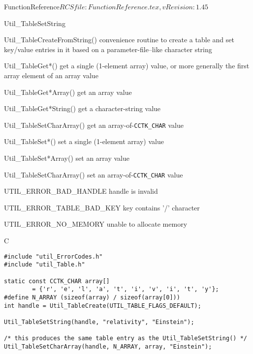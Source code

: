 \begin{cactuspart}{5}{FunctionReference}{$RCSfile: FunctionReference.tex,v $}{$Revision: 1.45 $}
\begin{FunctionDescription}{Util\_TableSetString}
\begin{SeeAlso}{Util\_TableCreateFromString()}
convenience routine to create a table and set key/value entries
in it based on a parameter-file--like character string
\end{SeeAlso}
\begin{SeeAlso}{Util\_TableGet*()}
get a single (1-element array) value,
or more generally the first array element of an array value
\end{SeeAlso}
\begin{SeeAlso}{Util\_TableGet*Array()}
get an array value
\end{SeeAlso}
\begin{SeeAlso}{Util\_TableGet*String()}
get a character-string value
\end{SeeAlso}
\begin{SeeAlso}{Util\_TableSetCharArray()}
get an array-of-\verb|CCTK_CHAR| value
\end{SeeAlso}
\begin{SeeAlso}{Util\_TableSet*()}
set a single (1-element array) value
\end{SeeAlso}
\begin{SeeAlso}{Util\_TableSet*Array()}
set an array value
\end{SeeAlso}
\begin{SeeAlso}{Util\_TableSetCharArray()}
set an array-of-\verb|CCTK_CHAR| value
\end{SeeAlso}

\begin{Error}{UTIL\_ERROR\_BAD\_HANDLE}
handle is invalid
\end{Error}
\begin{Error}{UTIL\_ERROR\_TABLE\_BAD\_KEY}
key contains '/' character
\end{Error}
\begin{Error}{UTIL\_ERROR\_NO\_MEMORY}
unable to allocate memory
\end{Error}

\begin{Example}{C}
\begin{verbatim}
#include "util_ErrorCodes.h"
#include "util_Table.h"

static const CCTK_CHAR array[]
        = {'r', 'e', 'l', 'a', 't', 'i', 'v', 'i', 't', 'y'};
#define N_ARRAY (sizeof(array) / sizeof(array[0]))
int handle = Util_TableCreate(UTIL_TABLE_FLAGS_DEFAULT);

Util_TableSetString(handle, "relativity", "Einstein");

/* this produces the same table entry as the Util_TableSetString() */
Util_TableSetCharArray(handle, N_ARRAY, array, "Einstein");
\end{verbatim}
\end{Example}
\end{FunctionDescription}


\end{cactuspart}
